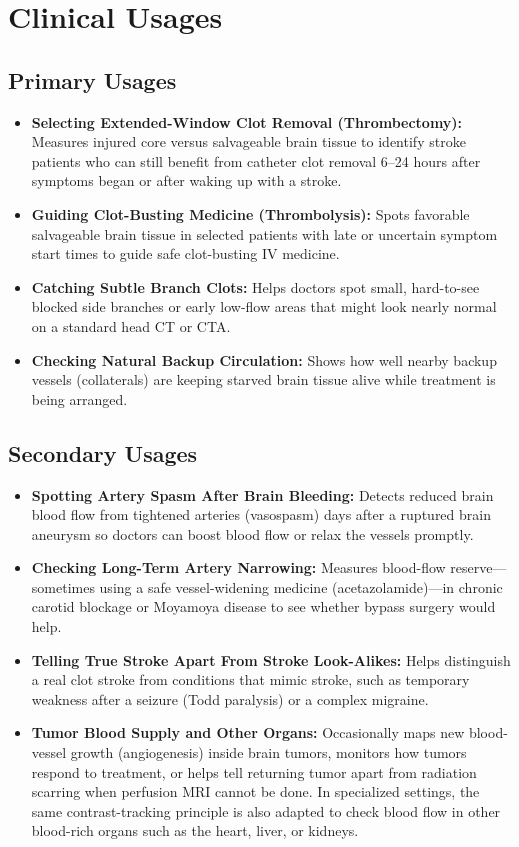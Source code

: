 \section{Clinical Usages}

\subsection{Primary Usages}
\begin{itemize}
    \item \textbf{Selecting Extended-Window Clot Removal (Thrombectomy):} Measures injured core versus salvageable brain tissue to identify stroke patients who can still benefit from catheter clot removal 6--24 hours after symptoms began or after waking up with a stroke.
    \item \textbf{Guiding Clot-Busting Medicine (Thrombolysis):} Spots favorable salvageable brain tissue in selected patients with late or uncertain symptom start times to guide safe clot-busting IV medicine.
    \item \textbf{Catching Subtle Branch Clots:} Helps doctors spot small, hard-to-see blocked side branches or early low-flow areas that might look nearly normal on a standard head CT or CTA.
    \item \textbf{Checking Natural Backup Circulation:} Shows how well nearby backup vessels (collaterals) are keeping starved brain tissue alive while treatment is being arranged.
\end{itemize}

\subsection{Secondary Usages}
\begin{itemize}
    \item \textbf{Spotting Artery Spasm After Brain Bleeding:} Detects reduced brain blood flow from tightened arteries (vasospasm) days after a ruptured brain aneurysm so doctors can boost blood flow or relax the vessels promptly.
    \item \textbf{Checking Long-Term Artery Narrowing:} Measures blood-flow reserve---sometimes using a safe vessel-widening medicine (acetazolamide)---in chronic carotid blockage or Moyamoya disease to see whether bypass surgery would help.
    \item \textbf{Telling True Stroke Apart From Stroke Look-Alikes:} Helps distinguish a real clot stroke from conditions that mimic stroke, such as temporary weakness after a seizure (Todd paralysis) or a complex migraine.
    \item \textbf{Tumor Blood Supply and Other Organs:} Occasionally maps new blood-vessel growth (angiogenesis) inside brain tumors, monitors how tumors respond to treatment, or helps tell returning tumor apart from radiation scarring when perfusion MRI cannot be done. In specialized settings, the same contrast-tracking principle is also adapted to check blood flow in other blood-rich organs such as the heart, liver, or kidneys.
\end{itemize}


